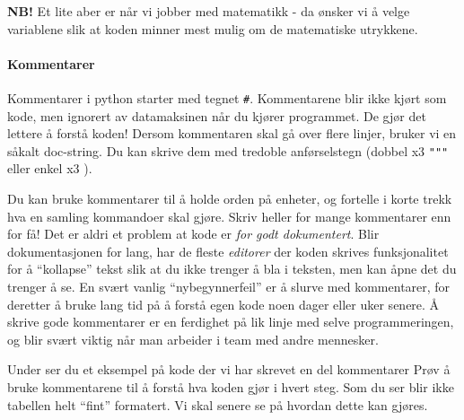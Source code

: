 \documentclass[11pt]{article}
\begin{document}
\textbf{NB!} Et lite aber er når vi jobber med matematikk - da ønsker vi
å velge variablene slik at koden minner mest mulig om de matematiske
utrykkene.

    \hypertarget{kommentarer}{%
\paragraph{Kommentarer}\label{kommentarer}}

Kommentarer i python starter med tegnet \texttt{\#}. Kommentarene blir
ikke kjørt som kode, men ignorert av datamaksinen når du kjører
programmet. De gjør det lettere å forstå koden! Dersom kommentaren skal
gå over flere linjer, bruker vi en såkalt doc-string. Du kan skrive dem
med tredoble anførselstegn (dobbel x3 \texttt{"""} eller enkel x3
\texttt{\textquotesingle{}\textquotesingle{}\textquotesingle{}}).

    Du kan bruke kommentarer til å holde orden på enheter, og fortelle i
korte trekk hva en samling kommandoer skal gjøre. Skriv heller for mange
kommentarer enn for få! Det er aldri et problem at kode er \emph{for
godt dokumentert}. Blir dokumentasjonen for lang, har de fleste
\emph{editorer} der koden skrives funksjonalitet for å ``kollapse''
tekst slik at du ikke trenger å bla i teksten, men kan åpne det du
trenger å se. En svært vanlig ``nybegynnerfeil'' er å slurve med
kommentarer, for deretter å bruke lang tid på å forstå egen kode noen
dager eller uker senere. Å skrive gode kommentarer er en ferdighet på
lik linje med selve programmeringen, og blir svært viktig når man
arbeider i team med andre mennesker.

    Under ser du et eksempel på kode der vi har skrevet en del kommentarer
Prøv å bruke kommentarene til å forstå hva koden gjør i hvert steg. Som
du ser blir ikke tabellen helt ``fint'' formatert. Vi skal senere se på
hvordan dette kan gjøres.
\end{document}
